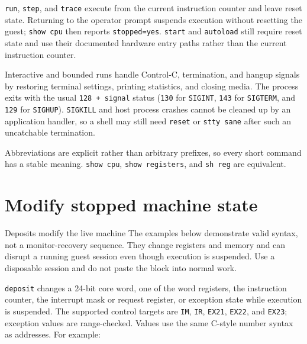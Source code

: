\passthrough{\lstinline!run!}, \passthrough{\lstinline!step!}, and \passthrough{\lstinline!trace!} execute from the current instruction counter and leave reset state. Returning to the operator prompt suspends execution without resetting the guest; \passthrough{\lstinline!show cpu!} then reports \passthrough{\lstinline!stopped=yes!}. \passthrough{\lstinline!start!} and \passthrough{\lstinline!autoload!} still require reset state and use their documented hardware entry paths rather than the current instruction counter.

Interactive and bounded runs handle Control-C, termination, and hangup signals by restoring terminal settings, printing statistics, and closing media. The process exits with the usual \passthrough{\lstinline!128 + signal!} status (\passthrough{\lstinline!130!} for \passthrough{\lstinline!SIGINT!}, \passthrough{\lstinline!143!} for \passthrough{\lstinline!SIGTERM!}, and \passthrough{\lstinline!129!} for \passthrough{\lstinline!SIGHUP!}). \passthrough{\lstinline!SIGKILL!} and host process crashes cannot be cleaned up by an application handler, so a shell may still need \passthrough{\lstinline!reset!} or \passthrough{\lstinline!stty sane!} after such an uncatchable termination.

Abbreviations are explicit rather than arbitrary prefixes, so every short command has a stable meaning. \passthrough{\lstinline!show cpu!}, \passthrough{\lstinline!show registers!}, and \passthrough{\lstinline!sh reg!} are equivalent.

\section{Modify stopped machine state}\label{modify-stopped-machine-state}

\begin{operationnote}{Deposits modify the live machine}
The examples below demonstrate valid syntax, not a monitor-recovery sequence. They change registers and memory and can disrupt a running guest session even though execution is suspended. Use a disposable session and do not paste the block into normal work.
\end{operationnote}

\passthrough{\lstinline!deposit!} changes a 24-bit core word, one of the word registers, the instruction counter, the interrupt mask or request register, or exception state while execution is suspended. The supported control targets are \passthrough{\lstinline!IM!}, \passthrough{\lstinline!IR!}, \passthrough{\lstinline!EX21!}, \passthrough{\lstinline!EX22!}, and \passthrough{\lstinline!EX23!}; exception values are range-checked. Values use the same C-style number syntax as addresses. For example:

